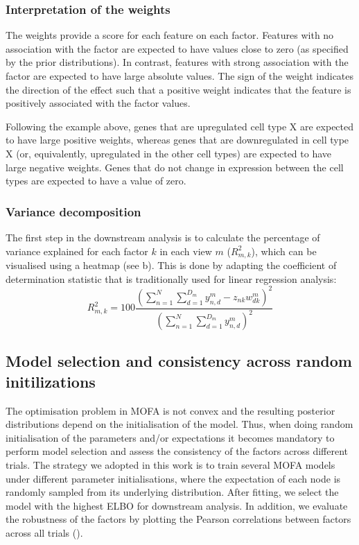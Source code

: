 
\subsubsection{Interpretation of the weights} \label{section:interpretation_weights}

The weights provide a score for each feature on each factor. Features with no association with the factor are expected to have values close to zero (as specified by the prior distributions). In contrast, features with strong association with the factor are expected to have large absolute values. The sign of the weight indicates the direction of the effect such that a positive weight indicates that the feature is positively associated with the factor values. 

Following the example above, genes that are upregulated cell type X are expected to have large positive weights, whereas genes that are downregulated in cell type X (or, equivalently, upregulated in the other cell types) are expected to have large negative weights. Genes that do not change in expression between the cell types are expected to have a value of zero.

\subsubsection{Variance decomposition} \label{section:variance_decomposition}

The first step in the downstream analysis is to calculate the percentage of variance explained for each factor $k$ in each view $m$ ($R^{2}_{m,k}$), which can be visualised using a heatmap (see b). This is done by adapting the coefficient of determination statistic that is traditionally used for linear regression analysis:
\begin{equation*}
	R^{2}_{m,k} = 100 \frac{ (\sum_{n=1}^{N} \sum_{d=1}^{D_m} y_{n,d}^{m} - z_{nk} w_{dk}^{m})^2 }{ (\sum_{n=1}^{N} \sum_{d=1}^{D_m} y_{n,d}^{m})^2 }
\end{equation*}

\subsection{Model selection and consistency across random initilizations} \label{section:mofa_robustness}

The optimisation problem in MOFA is not convex and the resulting posterior distributions depend on the initialisation of the model. Thus, when doing random initialisation of the parameters and/or expectations it becomes mandatory to perform model selection and assess the consistency of the factors across different trials. The strategy we adopted in this work is to train several MOFA models under different parameter initialisations, where the expectation of each node is randomly sampled from its underlying distribution. After fitting, we select the model with the highest ELBO for downstream analysis. In addition, we evaluate the robustness of the factors by plotting the Pearson correlations between factors across all trials ().

